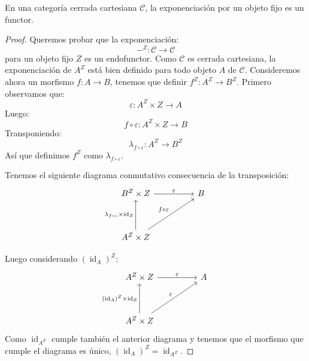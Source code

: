 \documentclass[12pt, twoside]{book}
\newcommand{\cat}{{\mathcal{C}}}
\DeclareMathOperator{\id}{id}
\begin{document}
\begin{lemma}
En una categoría cerrada cartesiana $\cat$, la exponenciación por un objeto fijo es un functor.
\end{lemma}
\begin{proof}
Queremos probar que la exponenciación:
\[ -^Z \colon \cat \to \cat \]
para un objeto fijo $Z$ es un endofunctor.
Como $\cat$ es cerrada cartesiana, la exponenciación de $A^Z$ está bien definido para todo objeto $A$ de $\cat$.
Consideremos ahora un morfismo $f \colon A \to B$, tenemos que definir $f^Z \colon A^Z \to B^Z$.
Primero observamos que:
\[ \varepsilon \colon A^Z \times Z \to A \]
Luego:
\[ f \circ \varepsilon \colon A^Z \times Z \to B\]
Transponiendo:
\[ \lambda_{f \circ \varepsilon} \colon A^Z \to B^Z \]
Así que definimos $f^Z$ como $\lambda_{f \circ \varepsilon}$.

Tenemos el siguiente diagrama conmutativo consecuencia de la transposición:
\[
\begin{tikzcd}
B^Z \times Z \arrow[rr,"\varepsilon"] & & B \\\\
A^Z \times Z \arrow[uu,"\lambda_{f\circ \varepsilon}\times\id_Z"]  \arrow[uurr,"f \circ \varepsilon"]
\end{tikzcd}
\]

Luego considerando $(\id_A)^Z$:
\[
\begin{tikzcd}
A^Z \times Z \arrow[rr,"\varepsilon"] & & A \\\\
A^Z \times Z \arrow[uu,"(\id_A)^Z\times\id_Z"]  \arrow[uurr,"\varepsilon"]
\end{tikzcd}
\]
Como $\id_{A^Z}$ cumple también el anterior diagrama y tenemos que el morfismo que cumple el diagrama es único, $(\id_A)^Z = \id_{A^Z}$.


\end{proof}
\end{document}
